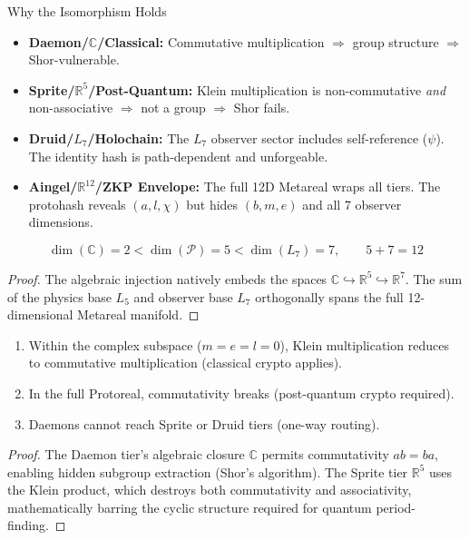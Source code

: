 \begin{aingelbox}{Why the Isomorphism Holds}
\begin{itemize}
    \item \textbf{Daemon/$\mathbb{C}$/Classical:} Commutative multiplication $\Rightarrow$ group structure $\Rightarrow$ Shor-vulnerable.
    \item \textbf{Sprite/$\mathbb{R}^5$/Post-Quantum:} Klein multiplication is non-commutative \emph{and} non-associative $\Rightarrow$ not a group $\Rightarrow$ Shor fails.
    \item \textbf{Druid/$L_7$/Holochain:} The $L_7$ observer sector includes self-reference ($\psi$). The identity hash is path-dependent and unforgeable.
    \item \textbf{Aingel/$\mathbb{R}^{12}$/ZKP Envelope:} The full 12D Metareal wraps all tiers. The protohash reveals $(a, l, \chi)$ but hides $(b, m, e)$ and all 7 observer dimensions.
\end{itemize}
\end{aingelbox}

\begin{theorem}
\begin{equation}
    \dim(\mathbb{C}) = 2 < \dim(\mathcal{P}) = 5 < \dim(L_7) = 7, \qquad 5 + 7 = 12
\end{equation}
\end{theorem}
\begin{proof}
The algebraic injection natively embeds the spaces $\mathbb{C} \hookrightarrow \mathbb{R}^5 \hookrightarrow \mathbb{R}^7$. The sum of the physics base $L_5$ and observer base $L_7$ orthogonally spans the full 12-dimensional Metareal manifold. \qedhere
\end{proof}

\begin{theorem}
\begin{enumerate}
    \item Within the complex subspace ($m = e = l = 0$), Klein multiplication reduces to commutative multiplication (classical crypto applies).
    \item In the full Protoreal, commutativity breaks (post-quantum crypto required).
    \item Daemons cannot reach Sprite or Druid tiers (one-way routing).
\end{enumerate}
\end{theorem}
\begin{proof}
The Daemon tier's algebraic closure $\mathbb{C}$ permits commutativity $ab = ba$, enabling hidden subgroup extraction (Shor's algorithm). The Sprite tier $\mathbb{R}^5$ uses the Klein product, which destroys both commutativity and associativity, mathematically barring the cyclic structure required for quantum period-finding. \qedhere
\end{proof}


